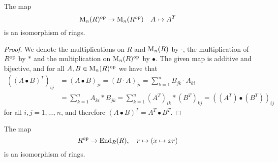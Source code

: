\begin{lemma}
  \label{lemma: op of matrix rings}
  The map
  \[
            \operatorname{M}_n(R)^{\mathrm{op}}
    \to     \operatorname{M}_n(R^{\mathrm{op}})
    \quad   A
    \mapsto A^T
  \]
  is an isomorphism of rings.
\end{lemma}


\begin{proof}
  We denote the multiplications on $R$ and $\operatorname{M}_n(R)$ by $\cdot$, the multiplication of $R^{\mathrm{op}}$ by $*$ and the multiplication on $\operatorname{M}_n(R)^{\mathrm{op}}$ by $\bullet$.
  The given map is additive and bijective, and for all $A, B \in \operatorname{M}_n(R)^{\mathrm{op}}$ we have that
  \begin{align*}
        \left( (A \bullet B)^T \right)_{ij}
    &=  (A \bullet B)_{ji}
     =  (B \cdot A)_{ji}
     =  \sum_{k=1}^n B_{jk} \cdot A_{ki}  \\
    &=  \sum_{k=1}^n A_{ki} * B_{jk}
     =  \sum_{k=1}^n (A^T)_{ik} * (B^T)_{kj}
     =  \left( (A^T) \bullet (B^T) \right)_{ij}
  \end{align*}
  for all $i, j = 1, \dotsc, n$, and therefore $(A \bullet B)^T = A^T \bullet B^T$.
\end{proof}






\begin{lemma}
  \label{lemma: End_R(R) = Rop}
  The map
  \[
              R^{\mathrm{op}}
    \to       \operatorname{End}_R(R),
    \quad     r
    \mapsto   (x \mapsto xr)
  \]
  is an isomorphism of rings.
\end{lemma}


